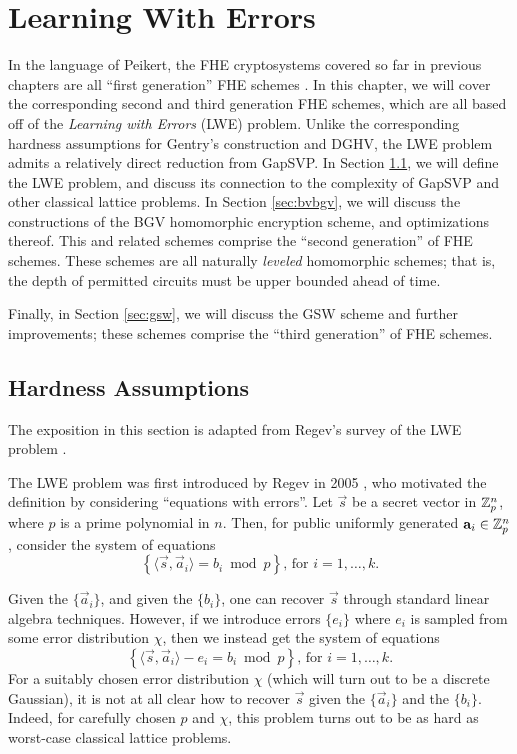 \chapter{Learning With Errors} \label{chap: lwe}
In the language of Peikert, the FHE cryptosystems covered so far in previous chapters are all ``first generation'' FHE schemes \cite{Peikertsurvey}. In this chapter, we will cover the corresponding second and third generation FHE schemes, which are all based off of the \emph{Learning with Errors} (LWE) problem. Unlike the corresponding hardness assumptions for Gentry's construction and DGHV, the LWE problem admits a relatively direct reduction from GapSVP. In Section \ref{sec:lwedef}, we will define the LWE problem, and discuss its connection to the complexity of GapSVP and other classical lattice problems. In Section \ref{sec:bvbgv}, we will discuss the constructions of the BGV homomorphic encryption scheme, and optimizations thereof. This and related schemes comprise the ``second generation'' of FHE schemes. These schemes are all naturally \emph{leveled} homomorphic schemes; that is, the depth of permitted circuits must be upper bounded ahead of time.

Finally, in Section \ref{sec:gsw}, we will discuss the GSW scheme and further improvements; these schemes comprise the ``third generation'' of FHE schemes.

\section{Hardness Assumptions} \label{sec:lwedef}
    The exposition in this section is adapted from Regev's survey of the LWE problem \cite{regev2010learning}.

The LWE problem was first introduced by Regev in 2005 \cite{regev2005}, who motivated the definition by considering ``equations with errors''. Let $\vec{s}$ be a secret vector in $\mathbb{Z}_p^n$, where $p$ is a prime polynomial in $n$. Then, for public uniformly generated $\mathbf{a}_i \in \mathbb{Z}_p^n$, consider the system of equations
\[
    \left\{ \langle \vec{s}, \vec{a}_i \rangle = b_i \bmod p \right \} \text{, for $i = 1, \dots, k$.}
\]

    Given the $\{\vec{a}_i\}$, and given the $\{b_i\}$, one can recover $\vec{s}$ through standard linear algebra techniques. However, if we introduce errors $\{e_i\}$ where $e_i$ is sampled from some error distribution $\chi$, then we instead get the system of equations
\[
    \left\{ \langle \vec{s}, \vec{a}_i \rangle - e_i = b_i \bmod p \right \} \text{, for $i = 1, \dots, k$.}
\]
    For a suitably chosen error distribution $\chi$ (which will turn out to be a discrete Gaussian), it is not at all clear how to recover $\vec{s}$ given the $\{\vec{a}_i\}$ and the $\{b_i\}$. Indeed, for carefully chosen $p$ and $\chi$, this problem turns out to be as hard as worst-case classical lattice problems.

